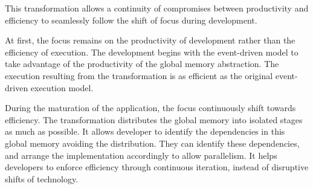 This transformation allows a continuity of compromises between productivity and efficiency to seamlessly follow the shift of focus during development.






At first, the focus remains on the productivity of development rather than the efficiency of execution.
The development begins with the event-driven model to take advantage of the productivity of the global memory abstraction.
The execution resulting from the transformation is as efficient as the original event-driven execution model.


During the maturation of the application, the focus continuously shift towards efficiency.
The transformation distributes the global memory into isolated stages as much as possible.
It allows developer to identify the dependencies in this global memory avoiding the distribution.
They can identify these dependencies, and arrange the implementation accordingly to allow parallelism.
It helps developers to enforce efficiency through continuous iteration, instead of disruptive shifts of technology.

